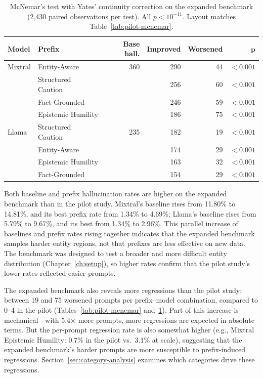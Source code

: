 \begin{table}[ht]
\centering
\small
\begin{tabular}{ll rrrr}
\toprule
\textbf{Model} & \textbf{Prefix} & \textbf{Base hall.} & \textbf{Improved} & \textbf{Worsened} & $\boldsymbol{p}$ \\
\midrule
Mixtral & Entity-Aware       & 360 & 290 &  44 & $< 0.001$ \\
        & Structured Caution &     & 256 &  60 & $< 0.001$ \\
        & Fact-Grounded      &     & 246 &  59 & $< 0.001$ \\
        & Epistemic Humility &     & 186 &  75 & $< 0.001$ \\[3pt]
Llama   & Structured Caution & 235 & 182 &  19 & $< 0.001$ \\
        & Entity-Aware       &     & 174 &  29 & $< 0.001$ \\
        & Epistemic Humility &     & 163 &  32 & $< 0.001$ \\
        & Fact-Grounded      &     & 154 &  29 & $< 0.001$ \\
\bottomrule
\end{tabular}
\caption[McNemar's test results for the replication]{McNemar's test with Yates' continuity correction on the expanded benchmark (2,430 paired observations per test). All $p < 10^{-11}$. Layout matches Table~\ref{tab:pilot-mcnemar}.}
\label{tab:replication-mcnemar}
\end{table}

Both baseline and prefix hallucination rates are higher on the expanded benchmark than in the pilot study. Mixtral's baseline rises from 11.80\% to 14.81\%, and its best prefix rate from 1.34\% to 4.69\%; Llama's baseline rises from 5.79\% to 9.67\%, and its best from 1.34\% to 2.96\%. This parallel increase of baselines and prefix rates rising together indicates that the expanded benchmark samples harder entity regions, not that prefixes are less effective on new data. The benchmark was designed to test a broader and more difficult entity distribution (Chapter~\ref{ch:setup}), so higher rates confirm that the pilot study's lower rates reflected easier prompts.

The expanded benchmark also reveals more regressions than the pilot study: between 19 and 75 worsened prompts per prefix--model combination, compared to 0--4 in the pilot (Tables~\ref{tab:pilot-mcnemar} and~\ref{tab:replication-mcnemar}). Part of this increase is mechanical---with 5.4$\times$ more prompts, more regressions are expected in absolute terms. But the per-prompt regression rate is also somewhat higher (e.g., Mixtral Epistemic Humility: 0.7\% in the pilot vs.\ 3.1\% at scale), suggesting that the expanded benchmark's harder prompts are more susceptible to prefix-induced regressions. Section~\ref{sec:category-analysis} examines which categories drive these regressions.

